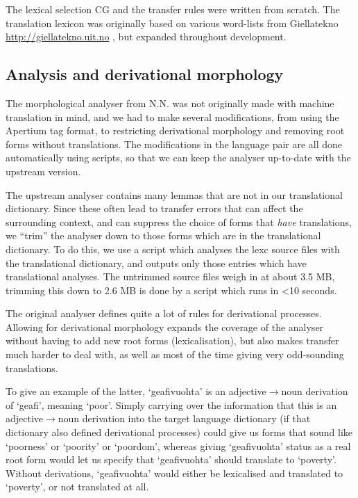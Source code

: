 The lexical selection CG and the transfer rules were written from
scratch. The translation lexicon was originally based on various
word-lists from Giellatekno
\href{http://giellatekno.uit.no}{http://giellatekno.uit.no}
, but expanded throughout
development.
\subsection{Analysis and derivational morphology}
The morphological analyser from N.N. was not
originally made with machine translation in mind, and we had to make
several modifications, from using the Apertium tag format, to
restricting derivational morphology and removing root forms without
translations. The modifications in the language pair are all done
automatically using scripts, so that we can keep the analyser
up-to-date with the upstream version.

The upstream analyser contains many lemmas that are not in our
translational dictionary. Since these often lead to transfer errors
that can affect the surrounding context, and can suppress the choice
of forms that \textit{have} translations, we ``trim'' the analyser
down to those forms which are in the translational dictionary. To do
this, we use a script which analyses the lexc source files with the
translational dictionary, and outputs only those entries which have
translational analyses. The untrimmed source files weigh in at about
3.5 MB, trimming this down to 2.6 MB is done by a script which runs in
<10 seconds.

The original analyser defines quite a lot of rules for derivational
processes. Allowing for derivational morphology expands the coverage
of the analyser without having to add new root forms (lexicalisation),
but also makes transfer much harder to deal with, as well as most of
the time giving very odd-sounding translations.

To give an example of the latter, `geafivuohta' is an
adjective$\rightarrow{}$noun derivation of `geafi', meaning `poor'.
Simply carrying over the information that this is an
adjective$\rightarrow{}$noun derivation into the target language
dictionary (if that dictionary also defined derivational processes)
could give us forms that sound like `poorness' or `poority' or
`poordom', whereas giving `geafivuohta' status as a real root form
would let us specify that `geafivuohta' should translate to `poverty'.
Without derivations, `geafivuohta' would either be lexicalised and
translated to `poverty', or not translated at all.

